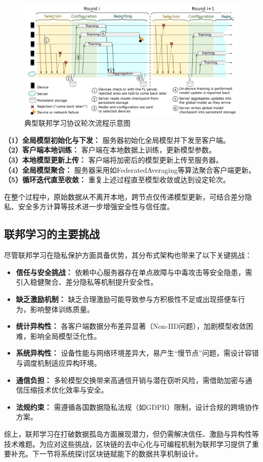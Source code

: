 \begin{figure}[htbp]
    \centering
    \includegraphics[width=\textwidth]{Imgs/FL-Learning-Protocol.png}
    \caption{典型联邦学习协议轮次流程示意图\cite{bonawitz2019towards}}
    \label{fig:fl_protocol_round}
\end{figure}

\textbf{（1）全局模型初始化与下发：} 服务器初始化全局模型并下发至客户端。\\
\textbf{（2）客户端本地训练：} 客户端在本地数据上训练，更新模型参数。\\
\textbf{（3）本地模型更新上传：} 客户端将加密后的模型更新上传至服务器。\\
\textbf{（4）全局模型聚合：} 服务器采用如FederatedAveraging等算法聚合客户端更新。\\
\textbf{（5）循环迭代直至收敛：} 重复上述过程直至模型收敛或达到设定轮次。

在整个过程中，原始数据从不离开本地，跨节点仅传递模型更新，可结合差分隐私、安全多方计算等技术进一步增强安全性与信任度。

\subsection{联邦学习的主要挑战}
尽管联邦学习在隐私保护方面具备优势，其分布式架构也带来了以下关键挑战\cite{zhu2023blockchain,li2020federated}：

\begin{itemize}
    \item \textbf{信任与安全挑战：} 依赖中心服务器存在单点故障与中毒攻击等安全隐患，需引入稳健聚合、差分隐私等机制提升安全性。
    \item \textbf{缺乏激励机制：} 缺乏合理激励可能导致参与方积极性不足或出现搭便车行为，影响整体训练质量。
    \item \textbf{统计异构性：} 各客户端数据分布差异显著（Non-IID问题），加剧模型收敛困难，影响全局模型泛化性。
    \item \textbf{系统异构性：} 设备性能与网络环境差异大，易产生“慢节点”问题，需设计容错与调度机制适应异构环境。
    \item \textbf{通信负担：} 多轮模型交换带来高通信开销与潜在窃听风险，需借助加密与通信压缩技术优化效率与安全。
    \item \textbf{法规约束：} 需遵循各国数据隐私法规（如GDPR）限制，设计合规的跨境协作方案\cite{li2019impact}。
\end{itemize}

综上，联邦学习在打破数据孤岛方面展现潜力，但仍需解决信任、激励与异构性等技术难题。为应对这些挑战，区块链的去中心化与可编程机制为联邦学习提供了重要补充。下一节将系统探讨区块链赋能下的数据共享机制设计。